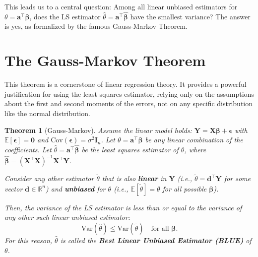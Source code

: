 \documentclass[11pt, letterpaper]{article}
\theoremstyle{plain} %
\newtheorem{theorem}{Theorem}[section]
\theoremstyle{definition} %
\theoremstyle{remark} %
\renewcommand{\mathbf}{\boldsymbol} %
\newcommand{\R}{\mathbb{R}}
\newcommand{\E}{\mathbb{E}}
\newcommand{\V}{\mathrm{Var}} %
\newcommand{\Cov}{\mathrm{Cov}} %
\newcommand{\I}{\mathbf{I}} %
\begin{document}
This leads us to a central question: Among all linear unbiased estimators for $\theta = \boldsymbol{a}^{\top}\boldsymbol{\beta}$, does the LS estimator $\hat{\theta} = \boldsymbol{a}^{\top}\hat{\boldsymbol{\beta}}$ have the smallest variance? The answer is yes, as formalized by the famous Gauss-Markov Theorem.

\section{The Gauss-Markov Theorem}

This theorem is a cornerstone of linear regression theory. It provides a powerful justification for using the least squares estimator, relying only on the assumptions about the first and second moments of the errors, not on any specific distribution like the normal distribution.

\begin{theorem}[Gauss-Markov] \label{thm:gauss_markov}
Assume the linear model holds: $\boldsymbol{Y} = \boldsymbol{X}\boldsymbol{\beta} + \boldsymbol{\epsilon}$ with $\E[\boldsymbol{\epsilon}] = \mathbf{0}$ and $\Cov(\boldsymbol{\epsilon}) = \sigma^2 \I_n$. Let $\theta = \boldsymbol{a}^{\top}\boldsymbol{\beta}$ be any linear combination of the coefficients. Let $\hat{\theta} = \boldsymbol{a}^{\top}\hat{\boldsymbol{\beta}}$ be the least squares estimator of $\theta$, where $\hat{\boldsymbol{\beta}} = (\boldsymbol{X}^{\top}\boldsymbol{X})^{-1}\boldsymbol{X}^{\top}\boldsymbol{Y}$.

Consider any other estimator $\tilde{\theta}$ that is also \textbf{linear} in $\boldsymbol{Y}$ (i.e., $\tilde{\theta} = \boldsymbol{d}^{\top}\boldsymbol{Y}$ for some vector $\boldsymbol{d} \in \R^n$) and \textbf{unbiased} for $\theta$ (i.e., $\E[\tilde{\theta}] = \theta$ for all possible $\boldsymbol{\beta}$).

Then, the variance of the LS estimator is less than or equal to the variance of any other such linear unbiased estimator:
\[
\V(\hat{\theta}) \le \V(\tilde{\theta}) \quad \text{for all } \boldsymbol{\beta}.
\]
For this reason, $\hat{\theta}$ is called the \textbf{Best Linear Unbiased Estimator (BLUE)} of $\theta$.
\end{theorem}
\end{document}

